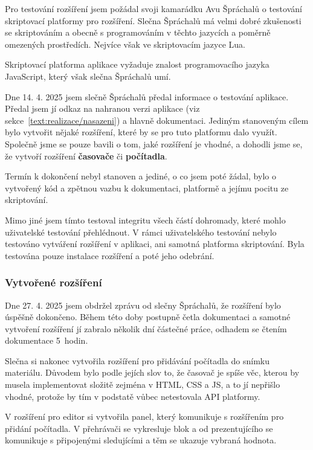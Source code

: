 Pro testování rozšíření jsem požádal svoji kamarádku Avu Špráchalů o testování skriptovací platformy pro rozšíření.
Slečna Špráchalů má velmi dobré zkušenosti se skriptováním a obecně s programováním v těchto jazycích a poměrně omezených prostředích.
Nejvíce však ve skriptovacím jazyce Lua.

Skriptovací platforma aplikace vyžaduje znalost programovacího jazyka JavaScript, který však slečna Špráchalů umí.

Dne 14. 4. 2025 jsem slečně Špráchalů předal informace o testování aplikace.
Předal jsem jí odkaz na nahranou verzi aplikace (viz sekce~\ref{text:realizace/nasazeni}) a hlavně dokumentaci.
Jediným stanoveným cílem bylo vytvořit nějaké rozšíření, které by se pro tuto platformu dalo využít.
Společně jsme se pouze bavili o tom, jaké rozšíření je vhodné, a dohodli jsme se, že vytvoří rozšíření \textbf{časovače} či \textbf{počítadla}.

Termín k dokončení nebyl stanoven a jediné, o co jsem poté žádal, bylo o vytvořený kód a zpětnou vazbu k dokumentaci, platformě a jejímu pocitu ze skriptování.

Mimo jiné jsem tímto testoval integritu všech částí dohromady, které mohlo uživatelské testování přehlédnout.
V rámci uživatelského testování nebylo testováno vytváření rozšíření v aplikaci, ani samotná platforma skriptování. 
Byla testována pouze instalace rozšíření a poté jeho odebrání.

\subsubsection{Vytvořené rozšíření}

Dne 27. 4. 2025 jsem obdržel zprávu od slečny Špráchalů, že rozšíření bylo úspěšně dokončeno.
Během této doby postupně četla dokumentaci a samotné vytvoření rozšíření jí zabralo několik dní částečné práce, odhadem se čtením dokumentace 5~hodin.

Slečna si nakonec vytvořila rozšíření pro přidávání počítadla do snímku materiálu.
Důvodem bylo podle jejích slov to, že časovač je spíše věc, kterou by musela implementovat složitě zejména v HTML, CSS a JS, a to jí nepřišlo vhodné, protože by tím v podstatě vůbec netestovala API platformy.

V rozšíření pro editor si vytvořila panel, který komunikuje s rozšířením pro přidání počítadla. V přehrávači se vykresluje blok a od prezentujícího se komunikuje s připojenými sledujícími a těm se ukazuje vybraná hodnota.

